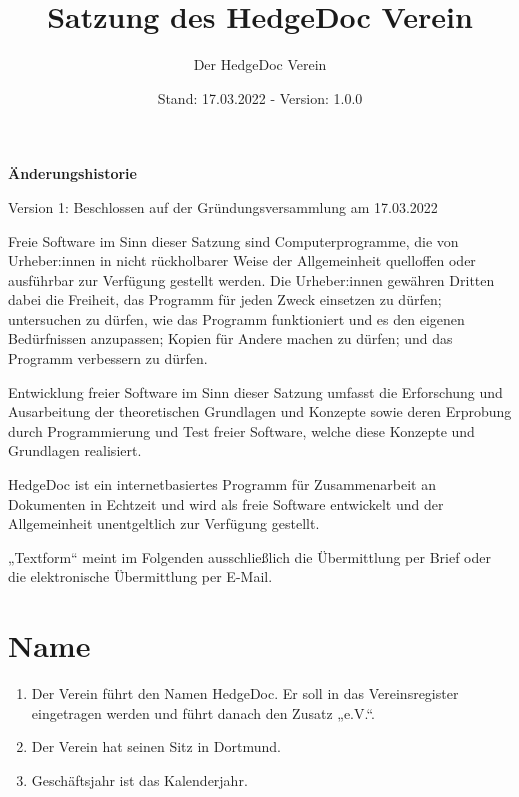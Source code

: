 \documentclass[12pt,paper=a4,ngerman]{scrreprt}
\author{Der HedgeDoc Verein}
\title{Satzung des HedgeDoc Verein}
\date{Stand: 17.03.2022 - Version: 1.0.0}
\begin{document}
	\maketitle
	\newpage
	
	\textbf{Änderungshistorie}
	\begin{description}
		\item
			Version 1: Beschlossen auf der Gründungsversammlung am 17.03.2022
	\end{description}
	\newpage
	
	\tableofcontents
	\newpage
	
        Freie Software im Sinn dieser Satzung sind Computerprogramme, die von Urheber:innen in nicht rückholbarer Weise der Allgemeinheit quelloffen oder ausführbar zur Verfügung gestellt werden. Die Urheber:innen gewähren Dritten dabei die Freiheit, das Programm für jeden Zweck einsetzen zu dürfen; untersuchen zu dürfen, wie das Programm funktioniert und es den eigenen Bedürfnissen anzupassen; Kopien für Andere machen zu dürfen; und das Programm verbessern zu dürfen.
        
        Entwicklung freier Software im Sinn dieser Satzung umfasst die Erforschung und Ausarbeitung der theoretischen Grundlagen und Konzepte sowie deren Erprobung durch Programmierung und Test freier Software, welche diese Konzepte und Grundlagen realisiert.
        
        HedgeDoc ist ein internetbasiertes Programm für Zusammenarbeit an Dokumenten in Echtzeit und wird als freie Software entwickelt und der Allgemeinheit unentgeltlich zur Verfügung gestellt.
        
        „Textform“ meint im Folgenden ausschließlich die Übermittlung per Brief oder die elektronische Übermittlung per E-Mail.
    
	\section{Name}
	\begin{enumerate}
		\item
			Der Verein führt den Namen HedgeDoc. Er soll in das Vereinsregister eingetragen werden und führt danach den Zusatz „e.V.“.
		\item
			Der Verein hat seinen Sitz in Dortmund.
		\item
			Geschäftsjahr ist das Kalenderjahr.
	\end{enumerate}
	
\end{document}
